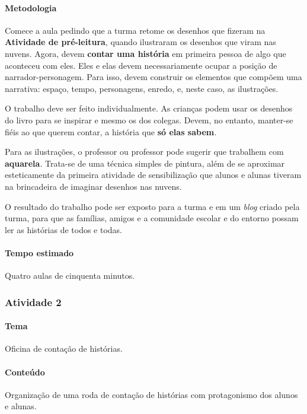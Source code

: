 \documentclass[11pt]{extarticle}
\begin{document}

\paragraph{Metodologia} Comece a aula pedindo que a turma retome os desenhos que fizeram
na \textbf{Atividade de pré-leitura}, quando ilustraram os
desenhos que viram nas nuvens. 
Agora, devem \textbf{contar uma história} em primeira pessoa de algo que aconteceu com eles.  
Eles e elas devem necessariamente ocupar a posição de narrador-personagem.
Para isso, devem construir os elementos que compõem uma narrativa: espaço, tempo, personagens, enredo, e,
neste caso, as ilustrações. 

O trabalho deve ser feito individualmente. As crianças podem usar os desenhos do livro
para se inspirar e mesmo os dos colegas. Devem, no entanto, manter-se fiéis 
ao que querem contar, a história que \textbf{só elas sabem}. 

Para as ilustrações, o professor ou professor pode sugerir que trabalhem com \textbf{aquarela}.
Trata-se de uma técnica simples de pintura, além de se aproximar esteticamente
da primeira atividade de sensibilização que alunos e alunas tiveram na brincadeira
de imaginar desenhos nas nuvens. 

O resultado do trabalho pode ser exposto para a turma e em um \textit{blog} criado
pela turma, para que as famílias, amigos e a comunidade escolar e do entorno possam 
ler as histórias de todos e todas. 

\paragraph{Tempo estimado} Quatro aulas de cinquenta minutos.


\subsubsection{Atividade 2}


\paragraph{Tema} Oficina de contação de histórias. 

\paragraph{Conteúdo} Organização de uma roda de contação de histórias
com protagonismo dos alunos e alunas.
\end{document}
